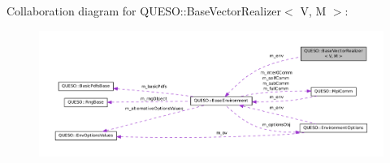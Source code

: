Collaboration diagram for Q\-U\-E\-S\-O\-:\-:Base\-Vector\-Realizer$<$ V, M $>$\-:
\nopagebreak
\begin{figure}[H]
\begin{center}
\leavevmode
\includegraphics[width=350pt]{class_q_u_e_s_o_1_1_base_vector_realizer__coll__graph}
\end{center}
\end{figure}
